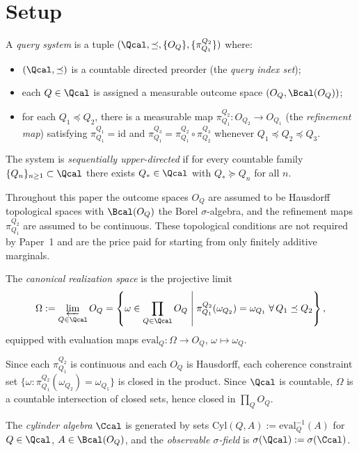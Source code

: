 \section{Setup}\label{sec:setup}

\begin{definition}
A \emph{query system} is a tuple $(\Qcal, \preceq, \{O_Q\},
\{\pi^{Q_2}_{Q_1}\})$ where:
\begin{itemize}
\item $(\Qcal, \preceq)$ is a countable directed preorder (the
  \emph{query index set});
\item each $Q \in \Qcal$ is assigned a measurable outcome space
  $(O_Q, \Bcal(O_Q))$;
\item for each $Q_1 \preceq Q_2$, there is a measurable map
  $\pi^{Q_2}_{Q_1} : O_{Q_2} \to O_{Q_1}$ (the
  \emph{refinement map}) satisfying $\pi^{Q_1}_{Q_1} = \mathrm{id}$
  and $\pi^{Q_3}_{Q_1} = \pi^{Q_2}_{Q_1} \circ \pi^{Q_3}_{Q_2}$
  whenever $Q_1 \preceq Q_2 \preceq Q_3$.
\end{itemize}
The system is \emph{sequentially upper-directed} if for every
countable family $\{Q_n\}_{n \ge 1} \subset \Qcal$ there exists
$Q_* \in \Qcal$ with $Q_* \succeq Q_n$ for all $n$.
\end{definition}

\begin{remark}
Throughout this paper the outcome spaces $O_Q$ are assumed to be
Hausdorff topological spaces with $\Bcal(O_Q)$ the Borel
$\sigma$-algebra, and the refinement maps $\pi^{Q_2}_{Q_1}$ are
assumed to be continuous.  These topological conditions are not
required by Paper~1 and are the price paid for starting from only
finitely additive marginals.
\end{remark}

\begin{definition}
The \emph{canonical realization space} is the projective limit
\[
\Omega
:=
\varprojlim_{Q \in \Qcal} O_Q
=
\left\{
\omega \in \prod_{Q \in \Qcal} O_Q
\;\middle|\;
\pi^{Q_2}_{Q_1}(\omega_{Q_2}) = \omega_{Q_1}
\;\forall\, Q_1 \preceq Q_2
\right\},
\]
equipped with evaluation maps $\mathrm{eval}_Q : \Omega \to O_Q$,
$\omega \mapsto \omega_Q$.

Since each $\pi^{Q_2}_{Q_1}$ is continuous and each $O_Q$ is
Hausdorff, each coherence constraint set
$\{\omega : \pi^{Q_2}_{Q_1}(\omega_{Q_2}) = \omega_{Q_1}\}$ is
closed in the product.  Since $\Qcal$ is countable, $\Omega$ is a
countable intersection of closed sets, hence closed in
$\prod_Q O_Q$.

The \emph{cylinder algebra} $\Ccal$ is generated by sets
$\mathrm{Cyl}(Q, A) := \mathrm{eval}_Q^{-1}(A)$ for $Q \in \Qcal$,
$A \in \Bcal(O_Q)$, and the \emph{observable $\sigma$-field} is
$\sigma(\Qcal) := \sigma(\Ccal)$.
\end{definition}

